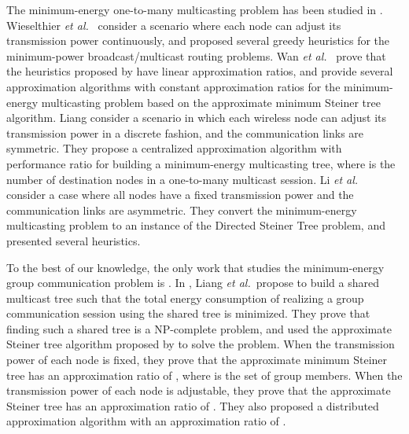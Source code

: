 \documentclass[10pt, conference, compsocconf]{IEEEtran}
\begin{document}
  The minimum-energy one-to-many multicasting problem has been studied in \cite{Wieselthier2000,Wan2004,Liang2006,Li2007}. Wieselthier \textit{et al.}\ \cite{Wieselthier2000} consider a scenario where each node can adjust its transmission power continuously, and proposed several greedy heuristics for the minimum-power broadcast/multicast routing problems. Wan \textit{et al.}\ \cite{Wan2004} prove that the heuristics proposed by \cite{Wieselthier2000} have linear approximation ratios, and provide several approximation algorithms with constant approximation ratios for the minimum-energy multicasting problem based on the approximate minimum Steiner tree algorithm. Liang \cite{Liang2006} consider a scenario in which each wireless node can adjust its transmission power in a discrete fashion, and the communication links are symmetric. They propose a centralized approximation algorithm with performance ratio  for building a minimum-energy multicasting tree, where  is the number of destination nodes in a one-to-many multicast session. Li \textit{et al.}\ \cite{Li2007} consider a case where all nodes have a fixed transmission power and the communication links are asymmetric. They convert the minimum-energy multicasting problem to an instance of the Directed Steiner Tree problem, and presented several heuristics.

  To the best of our knowledge, the only work that studies the minimum-energy group communication problem is \cite{Liang2009}. In \cite{Liang2009}, Liang \textit{et al.}\ propose to build a shared multicast tree such that the total energy consumption of realizing a group communication session using the shared tree is minimized. They prove that finding such a shared tree is a NP-complete problem, and used the approximate Steiner tree algorithm proposed by \cite{Kou1981} to solve the problem. When the transmission power of each node is fixed, they prove that the approximate minimum Steiner tree has an approximation ratio of , where  is the set of group members. When the transmission power of each node is adjustable, they prove that the approximate Steiner tree has an approximation ratio of . They also proposed a distributed approximation algorithm with an approximation ratio of .
\end{document}
